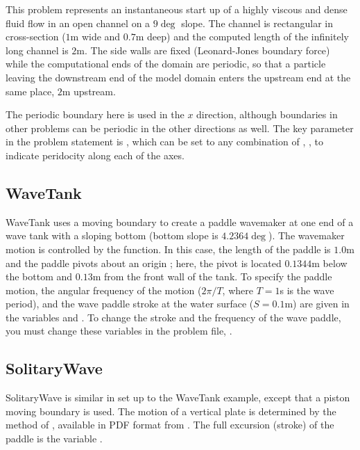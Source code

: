 \documentclass[12pt]{memoir}
\begin{document}
This problem represents an instantaneous start up of a highly viscous
and dense fluid flow in an open channel on a $9\deg$ slope. The
channel is rectangular in cross-section ($1$m wide and $0.7$m deep) and
the computed length of the infinitely long channel is $2$m. The side
walls are fixed (Leonard-Jones boundary force) while the computational
ends of the domain are periodic, so that a particle leaving the
downstream end of the model domain enters the upstream end at the same
place, $2$m upstream.

The periodic boundary here is used in the $x$ direction, although
boundaries in other problems can be periodic in the other directions as
well. The key parameter in the problem statement is
, which can be set to any combination of
, ,  to indicate
peridocity along each of the axes.


\subsection{WaveTank}

WaveTank uses a moving boundary to create a paddle wavemaker at one end
of a wave tank with a sloping bottom (bottom slope is $4.2364\deg$). The
wavemaker motion is controlled by the  function. In
this case, the length of the paddle is $1.0$m and the paddle pivots
about an origin ; here, the pivot is located $0.1344$m
below the bottom and $0.13$m from the front wall of the tank. To specify
the paddle motion, the angular frequency of the motion ($2 \pi/T$, where
$T=1$s is the wave period), and the wave paddle stroke at the water
surface ($S=0.1$m) are given in the variables  and
. To change the stroke and the frequency of the wave
paddle, you must change these variables in the problem file,
.

\iffalse
\begin{figure}[h]
\centering{%
\texttt{[image: paddle.png]}%
}
\caption{Schematic of the wave paddle for \cmd{WaveTank.cc}}
\end{figure}
\else
{}
\fi

\subsection{SolitaryWave}

SolitaryWave is similar in set up to the WaveTank example, except that a
piston moving boundary is used. The motion of a vertical plate is
determined by the method of \cite{goring_tsunamis_1979}, available in PDF format
from . The full
excursion (stroke) of the paddle is the variable .
\end{document}
